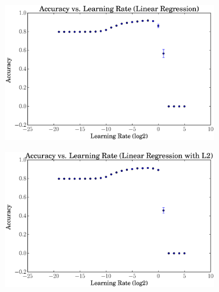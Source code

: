\documentclass[a4paper, 12pt]{article}
\begin{document}
\begin{figure}[htpb]
    \centering
    \begin{subfigure}[htpb]{0.45\textwidth}
        \includegraphics[width=\textwidth]{acc_vs_rate_linreg}
        \caption{}
        \label{fig:snt}
    \end{subfigure}
    \begin{subfigure}[htpb]{0.45\textwidth}
        \includegraphics[width=\textwidth]{acc_vs_rate_linregL2}
        \caption{}
        \label{fig:ret}
    \end{subfigure}
    \hfill %
    \begin{subfigure}[htpb]{0.45\textwidth}

\end{subfigure}
\end{figure}
\end{document}
